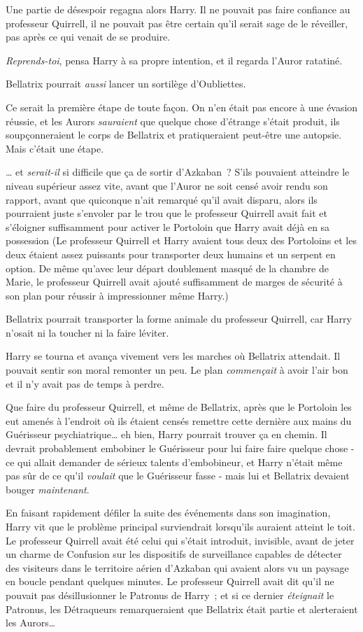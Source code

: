 Une partie de désespoir regagna alors Harry. Il ne pouvait pas faire confiance au professeur Quirrell, il ne pouvait pas être certain qu'il serait sage de le réveiller, pas après ce qui venait de se produire.

\emph{Reprends-toi}, pensa Harry à sa propre intention, et il regarda l'Auror ratatiné.

Bellatrix pourrait \emph{aussi} lancer un sortilège d'Oubliettes.

Ce serait la première étape de toute façon. On n'en était pas encore à une évasion réussie, et les Aurors \emph{sauraient} que quelque chose d'étrange s'était produit, ils soupçonneraient le corps de Bellatrix et pratiqueraient peut-être une autopsie. Mais c'était une étape.

… et \emph{serait-il} si difficile que ça de sortir d'Azkaban~? S'ils pouvaient atteindre le niveau supérieur assez vite, avant que l'Auror ne soit censé avoir rendu son rapport, avant que quiconque n'ait remarqué qu'il avait disparu, alors ils pourraient juste s'envoler par le trou que le professeur Quirrell avait fait et s'éloigner suffisamment pour activer le Portoloin que Harry avait déjà en sa possession (Le professeur Quirrell et Harry avaient tous deux des Portoloins et les deux étaient assez puissants pour transporter deux humains et un serpent en option. De même qu'avec leur départ doublement masqué de la chambre de Marie, le professeur Quirrell avait ajouté suffisamment de marges de sécurité à son plan pour réussir à impressionner même Harry.)

Bellatrix pourrait transporter la forme animale du professeur Quirrell, car Harry n'osait ni la toucher ni la faire léviter.

Harry se tourna et avança vivement vers les marches où Bellatrix attendait. Il pouvait sentir son moral remonter un peu. Le plan \emph{commençait} à avoir l'air bon et il n'y avait pas de temps à perdre.

Que faire du professeur Quirrell, et même de Bellatrix, après que le Portoloin les eut amenés à l'endroit où ils étaient censés remettre cette dernière aux mains du Guérisseur psychiatrique… eh bien, Harry pourrait trouver ça en chemin. Il devrait probablement embobiner le Guérisseur pour lui faire faire quelque chose - ce qui allait demander de sérieux talents d'embobineur, et Harry n'était même pas sûr de ce qu'il \emph{voulait} que le Guérisseur fasse - mais lui et Bellatrix devaient bouger \emph{maintenant}.

En faisant rapidement défiler la suite des événements dans son imagination, Harry vit que le problème principal surviendrait lorsqu'ils auraient atteint le toit. Le professeur Quirrell avait été celui qui s'était introduit, invisible, avant de jeter un charme de Confusion sur les dispositifs de surveillance capables de détecter des visiteurs dans le territoire aérien d'Azkaban qui avaient alors vu un paysage en boucle pendant quelques minutes. Le professeur Quirrell avait dit qu'il ne pouvait pas désillusionner le Patronus de Harry~; et si ce dernier \emph{éteignait} le Patronus, les Détraqueurs remarqueraient que Bellatrix était partie et alerteraient les Aurors…

